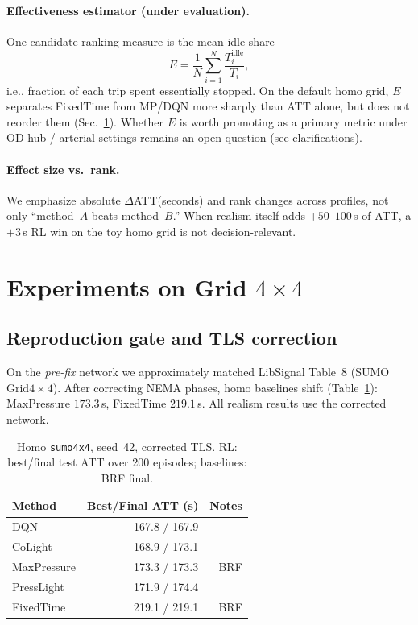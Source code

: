 \documentclass[11pt,a4paper]{article}
\newcommand{\att}{ATT}
\begin{document}
\paragraph{Effectiveness estimator (under evaluation).}
One candidate ranking measure is the mean idle share
\begin{equation}
  E = \frac{1}{N}\sum_{i=1}^{N} \frac{T^{\mathrm{idle}}_i}{T_i},
\end{equation}
i.e., fraction of each trip spent essentially stopped.
On the default homo grid, $E$ separates FixedTime from MP/DQN more sharply than ATT alone, but does not reorder them (Sec.~\ref{sec:results4x4}).
Whether $E$ is worth promoting as a primary metric under OD-hub / arterial settings remains an open question (see clarifications).

\paragraph{Effect size vs.\ rank.}
We emphasize absolute $\Delta$\att (seconds) and rank changes across profiles, not only ``method~$A$ beats method~$B$.''
When realism itself adds $+50$--$100$\,s of ATT, a $+3$\,s RL win on the toy homo grid is not decision-relevant.

\section{Experiments on Grid $4{\times}4$}
\label{sec:results4x4}

\subsection{Reproduction gate and TLS correction}
On the \emph{pre-fix} network we approximately matched LibSignal Table~8 (SUMO Grid$4{\times}4$).
After correcting NEMA phases, homo baselines shift (Table~\ref{tab:homo4x4}): MaxPressure $173.3$\,s, FixedTime $219.1$\,s.
All realism results use the corrected network.

\begin{table}[t]
\centering
\caption{Homo \texttt{sumo4x4}, seed~42, corrected TLS. RL: best/final test ATT over 200 episodes; baselines: BRF final.}
\label{tab:homo4x4}
\begin{tabular}{lrr}
\toprule
Method & Best/Final ATT (s) & Notes \\
\midrule
DQN        & 167.8 / 167.9 & \\
CoLight    & 168.9 / 173.1 & \\
MaxPressure& 173.3 / 173.3 & BRF \\
PressLight & 171.9 / 174.4 & \\
FixedTime  & 219.1 / 219.1 & BRF \\
\bottomrule
\end{tabular}
\end{table}
\end{document}
